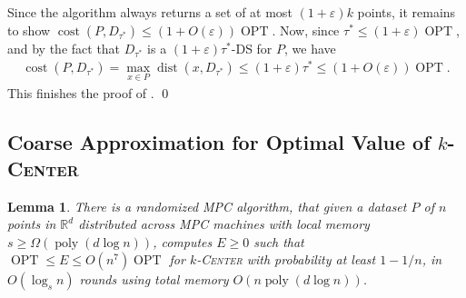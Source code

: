 \documentclass[11pt,letterpaper]{article}
\theoremstyle{plain}
\newtheorem{lemma}[theorem]{Lemma}
\theoremstyle{definition}
\theoremstyle{remark}
\newcommand{\ProblemName}[1]{\textsc{#1}}
\newcommand{\kCenter}{$k$-\ProblemName{Center}\xspace}
\DeclareMathOperator{\poly}{poly}
\DeclareMathOperator{\cost}{cost}
\DeclareMathOperator{\OPT}{OPT}
\DeclareMathOperator{\dist}{dist}
\renewcommand{\epsilon}{\ensuremath{\varepsilon}}
\let\epsilon\varepsilon
\begin{document}
Since the algorithm always returns a set of at most $(1 + \epsilon)k$ points, it remains to show $\cost(P, D_{\tau^*}) \leq (1 + O(\epsilon)) \OPT$.
Now, since $\tau^* \leq (1 + \epsilon) \OPT$, and by the fact that $D_{\tau^*}$ is a $(1 + \epsilon)\tau^*$-DS for $P$, we have
\begin{align*}
    \cost(P, D_{\tau^*})
    = \max_{x \in P} \dist(x, D_{\tau^*}) 
    \leq (1 + \epsilon) \tau^* 
    \leq (1 + O(\epsilon)) \OPT.
\end{align*}
This finishes the proof of . 
\qed








\subsection{Coarse Approximation for Optimal Value of \kCenter}
\label{subsec:guess}
\begin{lemma}
    \label{lemma:guess_OPT}
    There is a randomized MPC algorithm, that given a dataset $P$ of $n$ points in $\mathbb{R}^{d}$ distributed across MPC machines with local memory $s\geq \Omega(\poly(d\log n))$,
    computes $E \geq 0$ such that $\OPT \leq E \leq O(n^7) \OPT$ for \kCenter
    with probability at least $1-1/n$,
    in $O(\log_{s} n)$ rounds using total memory $O(n \poly(d\log n))$. 
\end{lemma}
\end{document}
